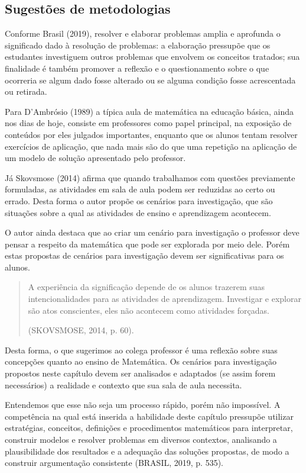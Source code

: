 \begin{apresentacao}
  \section{Sugestões de metodologias}

  Conforme Brasil (2019), resolver e elaborar problemas amplia e aprofunda o significado dado à resolução de problemas: a elaboração pressupõe que os estudantes investiguem outros problemas que envolvem os conceitos tratados; sua finalidade é também promover a reflexão e o questionamento sobre o que ocorreria se algum dado fosse alterado ou se alguma condição fosse acrescentada ou retirada.

  Para D’Ambrósio (1989) a típica aula de matemática na educação básica, ainda nos dias de hoje, consiste em professores como papel principal, na exposição de conteúdos por eles julgados importantes, enquanto que os alunos tentam resolver exercícios de aplicação, que nada mais são do que uma repetição na aplicação de um modelo de solução apresentado pelo professor.

  Já Skovsmose (2014) afirma que quando trabalhamos com questões previamente formuladas, as atividades em sala de aula podem ser reduzidas ao certo ou errado. Desta forma o autor propõe os cenários para investigação, que são situações sobre a qual as atividades de ensino e aprendizagem acontecem.

  O autor ainda destaca que ao criar um cenário para investigação o professor deve pensar a respeito da matemática que pode ser explorada por meio dele. Porém estas propostas de cenários para investigação devem ser significativas para os alunos.
  \columnbreak
  \begin{quote}
  A experiência da significação depende de os alunos trazerem suas intencionalidades para as atividades de aprendizagem. Investigar e explorar são atos conscientes, eles não acontecem como atividades forçadas.

  \flushright
  (SKOVSMOSE, 2014, p. 60).
  \end{quote}
  Desta forma, o que sugerimos ao colega professor é uma reflexão sobre suas concepções quanto ao ensino de Matemática. Os cenários para investigação propostos neste capítulo devem ser analisados e adaptados (se assim forem necessários) a realidade e contexto que sua sala de aula necessita.

  Entendemos que esse não seja um processo rápido, porém não impossível. A competência na qual está inserida a habilidade deste capítulo pressupõe utilizar estratégias, conceitos, definições e procedimentos matemáticos para interpretar, construir modelos e resolver problemas em diversos contextos, analisando a plausibilidade dos resultados e a adequação das soluções propostas, de modo a construir argumentação consistente (BRASIL, 2019, p. 535).


\end{apresentacao}
